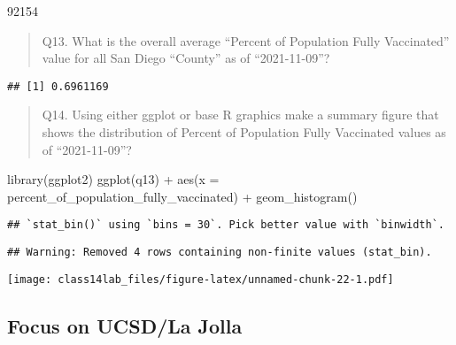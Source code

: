 \documentclass[
]{article}
\newenvironment{Shaded}{\begin{snugshade}}{\end{snugshade}}
\newcommand{\AttributeTok}[1]{\textcolor[rgb]{0.77,0.63,0.00}{#1}}
\newcommand{\ConstantTok}[1]{\textcolor[rgb]{0.00,0.00,0.00}{#1}}
\newcommand{\FunctionTok}[1]{\textcolor[rgb]{0.00,0.00,0.00}{#1}}
\newcommand{\NormalTok}[1]{#1}
\newcommand{\OtherTok}[1]{\textcolor[rgb]{0.56,0.35,0.01}{#1}}
\newcommand{\SpecialCharTok}[1]{\textcolor[rgb]{0.00,0.00,0.00}{#1}}
\newcommand{\StringTok}[1]{\textcolor[rgb]{0.31,0.60,0.02}{#1}}
\begin{document}
92154

\begin{quote}
Q13. What is the overall average ``Percent of Population Fully
Vaccinated'' value for all San Diego ``County'' as of ``2021-11-09''?
\end{quote}

\begin{Shaded}
\end{Shaded}

\begin{verbatim}
## [1] 0.6961169
\end{verbatim}

\begin{quote}
Q14. Using either ggplot or base R graphics make a summary figure that
shows the distribution of Percent of Population Fully Vaccinated values
as of ``2021-11-09''?
\end{quote}

\begin{Shaded}
\begin{Highlighting}[]
\FunctionTok{library}\NormalTok{(ggplot2)}
\FunctionTok{ggplot}\NormalTok{(q13) }\SpecialCharTok{+}
  \FunctionTok{aes}\NormalTok{(}\AttributeTok{x =}\NormalTok{ percent\_of\_population\_fully\_vaccinated) }\SpecialCharTok{+} 
  \FunctionTok{geom\_histogram}\NormalTok{()}
\end{Highlighting}
\end{Shaded}

\begin{verbatim}
## `stat_bin()` using `bins = 30`. Pick better value with `binwidth`.
\end{verbatim}

\begin{verbatim}
## Warning: Removed 4 rows containing non-finite values (stat_bin).
\end{verbatim}

\texttt{[image: class14lab\_files/figure-latex/unnamed-chunk-22-1.pdf]}

\hypertarget{focus-on-ucsdla-jolla}{%
\subsection{Focus on UCSD/La Jolla}\label{focus-on-ucsdla-jolla}}
\end{document}
